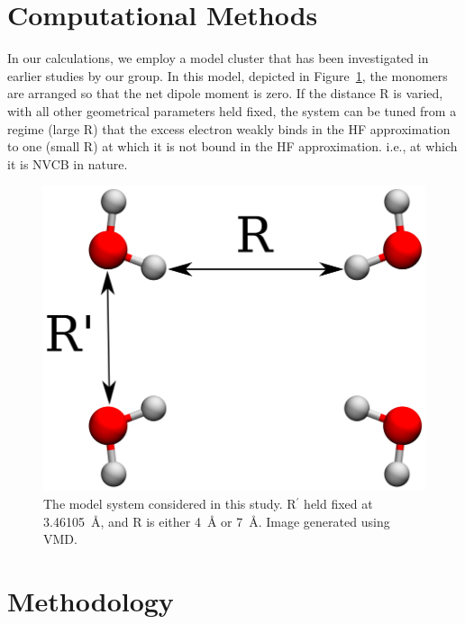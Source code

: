 \section{Computational Methods}
In our calculations, we employ a model  cluster that has been investigated in earlier studies by our group.\cite{10.1063/1.4991497,10.1021/acs.jpca.8b11881}
In this model, depicted in Figure~\ref{fig:water4cluster}, the monomers are arranged so that the net dipole moment is zero.
If the distance R is varied, with all other geometrical parameters held fixed, the system can be tuned from a regime (large R) that the excess electron weakly binds in the HF approximation to one (small R) at which it is not bound in the HF approximation. i.e., at which it is NVCB in nature.

\begin{figure}
    \includegraphics[width=\columnwidth,keepaspectratio]{Images/chapter3/h2o4_labeled.eps}
    \caption{\label{fig:water4cluster} The  model  system considered in this study. R$^{'}$ held fixed at \SI{3.46105}{\angstrom}, and R is either \SI{4}{\angstrom} or \SI{7}{\angstrom}. Image generated using VMD.\cite{10.1016/0263-78559600018-5}}
\end{figure}

\section{Methodology}
